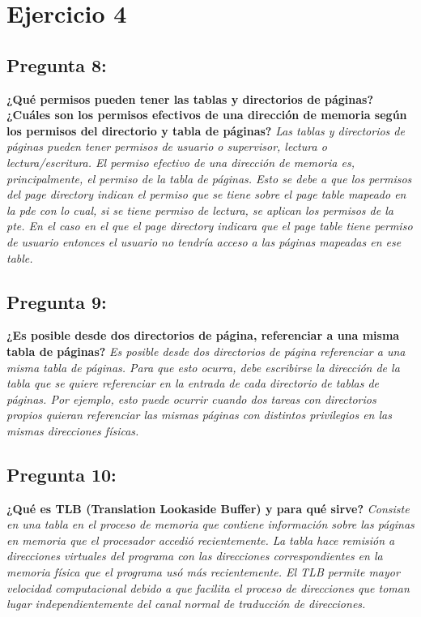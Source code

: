 \documentclass[10pt, a4paper]{article}
\begin{document}
\section{Ejercicio 4}
{\subsection{Pregunta 8:}} \textbf{¿Qué permisos pueden tener las tablas y directorios de páginas? ¿Cuáles son los permisos efectivos de una dirección de memoria según los permisos del directorio y tabla de páginas?}\newline
\newline
\textit{Las tablas y directorios de páginas pueden tener permisos de usuario o supervisor, lectura o lectura/escritura. El permiso efectivo de una dirección de memoria es, principalmente, el permiso de la tabla de páginas. Esto se debe a que los permisos del page directory indican el permiso que se tiene sobre el page table mapeado en la pde con lo cual, si se tiene permiso de lectura, se aplican los permisos de la pte. En el caso en el que el page directory indicara que el page table tiene permiso de usuario entonces el usuario no tendría acceso a las páginas mapeadas en ese table.}

{\subsection{Pregunta 9:}} \textbf{¿Es posible desde dos directorios de página, referenciar a una misma tabla de páginas?}\newline
\newline
\textit{Es posible desde dos directorios de página referenciar a una misma tabla de páginas. Para que esto ocurra, debe escribirse la dirección de la tabla que se quiere referenciar en la entrada de cada directorio de tablas de páginas. Por ejemplo, esto puede ocurrir cuando dos tareas con directorios propios quieran referenciar las mismas páginas con distintos privilegios en las mismas direcciones físicas.}

{\subsection{Pregunta 10:}} \textbf{¿Qué es TLB (Translation Lookaside Buffer) y para qué sirve?}\newline
\newline
\textit{Consiste en una tabla en el proceso de memoria que contiene información sobre las páginas en memoria que el procesador accedió recientemente. La tabla hace remisión a direcciones virtuales del programa con las direcciones correspondientes en la memoria física que el programa usó más recientemente. El TLB permite mayor velocidad computacional debido a que facilita el proceso de direcciones que toman lugar independientemente del canal normal de traducción de direcciones.}
\end{document}
